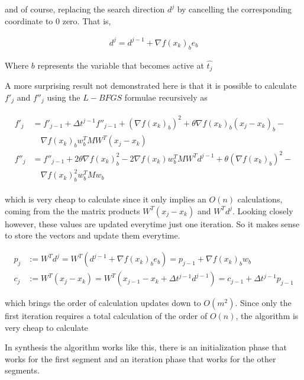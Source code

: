 and of course, replacing the search direction $d^j$ by cancelling the corresponding coordinate to $0$ zero. That is, 

\begin{equation}
  \begin{aligned}
    d^j = d^{j-1} + \nabla f(x_k)_b e_b
  \end{aligned}
\end{equation}

Where $b$ represents the variable that becomes active at $\hat{t_j}$

A more surprising result \citep{mainpaper} not demonstrated here is that it is possible to calculate $f'_j$ and $f''_j$ using the $L-BFGS$ formulae recursively as 

\begin{align} \label{cauchydeflbfgs}
  \begin{split}
  f'_j & = f'_{j-1} + \Delta t^{j-1} f''_{j-1} + (\nabla f(x_k)_b)^2 + \theta \nabla f(x_k)_b (x_j - x_k)_b - \\
  & \quad \nabla f(x_k)_b w_b^T MW^T (x_j - x_k) \\
  f''_j & = f''_{j-1} + 2 \theta \nabla f(x_k)_b^2 - 2 \nabla f(x_k) w_b^T M W^T d^{j-1} + \theta (\nabla f(x_k)_b)^2 - \\
  & \quad \nabla f(x_k)_b^2 w_b^T M w_b
  \end{split}
\end{align}

which is very cheap to calculate since it only implies an $O(n)$ calculations, coming from the the matrix products $W^T(x_j - x_k)$ and $W^Td^j$. Looking closely however, these values are updated everytime just one iteration. So it makes sense to store the vectors and update them everytime.

\begin{align} \label{cp}
  p_j & := W^Td^j = W^T(d^{j-1} + \nabla f(x_k)_b e_b) = p_{j-1} + \nabla f(x_k)_b w_b \\
  c_j & := W^T(x_j - x_k) = W^T(x_{j-1} - x_k + \Delta t^{j-1} d^{j-1}) = c_{j-1} + \Delta t^{j-1} p_{j-1}
\end{align}

which brings the order of calculation updates down to $O(m^2)$. Since only the first iteration requires a total calculation of the order of $O(n)$, the algorithm is very cheap to calculate

In synthesis the algorithm works like this, there is an initialization phase that works for the first segment and an iteration phase that works for the other segments.

